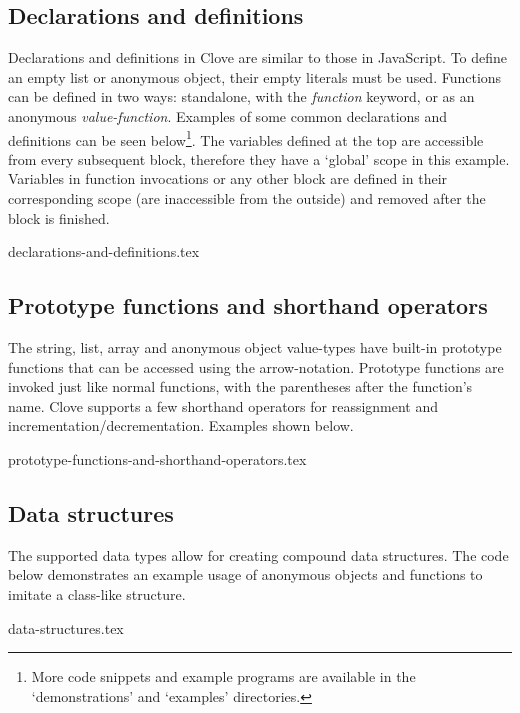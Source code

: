 \documentclass[12pt,a4paper]{article}
\begin{document}
\vspace{-0.25em}
\subsection*{Declarations and definitions}
Declarations and definitions in Clove are similar to those in JavaScript. To define an empty list or anonymous object, their empty literals must be used. Functions can be defined in two ways: standalone, with the \emph{function} keyword, or as an anonymous \emph{value-function}. Examples of some common declarations and definitions can be seen below\footnote{More code snippets and example programs are available in the `demonstrations' and `examples' directories.}. The variables defined at the top are accessible from every subsequent block, therefore they have a `global' scope in this example. Variables in function invocations or any other block are defined in their corresponding scope (are inaccessible from the outside) and removed after the block is finished.

{declarations-and-definitions.tex}



\subsection*{Prototype functions and shorthand operators}
The string, list, array and anonymous object value-types have built-in prototype functions that can be accessed using the arrow-notation. Prototype functions are invoked just like normal functions, with the parentheses after the function's name. Clove supports a few shorthand operators for reassignment and incrementation/decrementation. Examples shown below.

{prototype-functions-and-shorthand-operators.tex}



\vspace{-1.5em}
\subsection*{Data structures}
The supported data types allow for creating compound data structures. The code below demonstrates an example usage of anonymous objects and functions to imitate a class-like structure.

{data-structures.tex}
\end{document}
